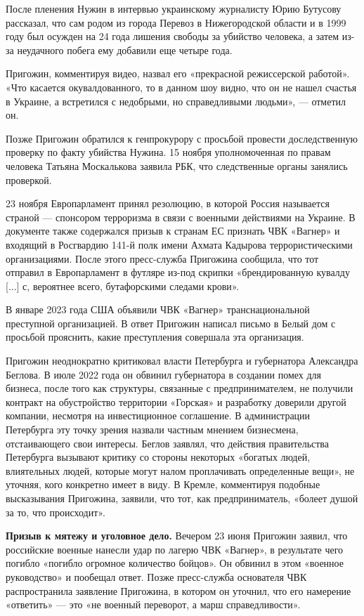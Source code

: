После пленения Нужин в интервью украинскому журналисту Юрию Бутусову рассказал, что сам родом из города Перевоз в Нижегородской области и в 1999 году был осужден на 24 года лишения свободы за убийство человека, а затем из-за неудачного побега ему добавили еще четыре года.

Пригожин, комментируя видео, назвал его «прекрасной режиссерской работой». «Что касается окувалдованного, то в данном шоу видно, что он не нашел счастья в Украине, а встретился с недобрыми, но справедливыми людьми», — отметил он.

Позже Пригожин обратился к генпрокурору с просьбой провести доследственную проверку по факту убийства Нужина. 15 ноября уполномоченная по правам человека Татьяна Москалькова заявила РБК, что следственные органы занялись проверкой.

23 ноября Европарламент принял резолюцию, в которой Россия называется страной — спонсором терроризма в связи с военными действиями на Украине. В документе также содержался призыв к странам ЕС признать ЧВК «Вагнер» и входящий в Росгвардию 141-й полк имени Ахмата Кадырова террористическими организациями. После этого пресс-служба Пригожина сообщила, что тот отправил в Европарламент в футляре из-под скрипки «брендированную кувалду [...] с, вероятнее всего, бутафорскими следами крови».

В январе 2023 года США объявили ЧВК «Вагнер» транснациональной преступной организацией. В ответ Пригожин написал письмо в Белый дом с просьбой прояснить, какие преступления совершала эта организация.

Пригожин неоднократно критиковал власти Петербурга и губернатора Александра Беглова. В июле 2022 года он обвинил губернатора в создании помех для бизнеса, после того как структуры, связанные с предпринимателем, не получили контракт на обустройство территории «Горская» и разработку доверили другой компании, несмотря на инвестиционное соглашение. В администрации Петербурга эту точку зрения назвали частным мнением бизнесмена, отстаивающего свои интересы. Беглов заявлял, что действия правительства Петербурга вызывают критику со стороны некоторых «богатых людей, влиятельных людей, которые могут налом проплачивать определенные вещи», не уточняя, кого конкретно имеет в виду. В Кремле, комментируя подобные высказывания Пригожина, заявили, что тот, как предприниматель, «болеет душой за то, что происходит».

\textbf{Призыв к мятежу и уголовное дело.} Вечером 23 июня Пригожин заявил, что российские военные нанесли удар по лагерю ЧВК «Вагнер», в результате чего погибло «погибло огромное количество бойцов». Он обвинил в этом «военное руководство» и пообещал ответ. Позже пресс-служба основателя ЧВК распространила заявление Пригожина, в котором он уточнил, что его намерение «ответить» --- это «не военный переворот, а марш справедливости».

